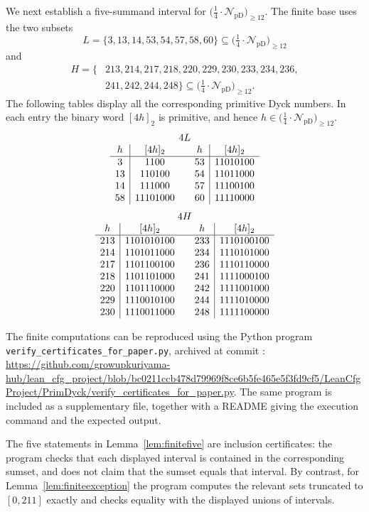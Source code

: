 \documentclass[12pt]{article}
\theoremstyle{plain}
\newcommand{\Pset}{\bigl(\tfrac14\cdot
  \mathcal N_{\mathrm{pD}}\bigr)_{\ge 12}}
\begin{document}
We next establish a five-summand interval for $\Pset$.  The finite base
uses the two subsets
\[
 L=\{3,13,14,53,54,57,58,60\}\subseteq\Pset
\]
and
\[
\begin{split}
 H=\{&213,214,217,218,220,229,230,233,234,236,\\
     &241,242,244,248\}\subseteq\Pset.
\end{split}
\]
The following tables display all the corresponding primitive Dyck
numbers.  In each entry the binary word $[4h]_2$ is primitive, and hence
$h\in\Pset$.
\[
\begin{array}{c|c@{\qquad}c|c}
\multicolumn{4}{c}{4L}\\
h&[4h]_2&h&[4h]_2\\ \hline
3&1100&53&11010100\\
13&110100&54&11011000\\
14&111000&57&11100100\\
58&11101000&60&11110000
\end{array}
\]
\[
\begin{array}{c|c@{\qquad}c|c}
\multicolumn{4}{c}{4H}\\
h&[4h]_2&h&[4h]_2\\ \hline
213&1101010100&233&1110100100\\
214&1101011000&234&1110101000\\
217&1101100100&236&1110110000\\
218&1101101000&241&1111000100\\
220&1101110000&242&1111001000\\
229&1110010100&244&1111010000\\
230&1110011000&248&1111100000
\end{array}
\]

The finite computations can be reproduced using the Python program
\texttt{verify\_certificates\_for\_paper.py}, archived at commit
:
\url{https://github.com/growupkuriyama-hub/lean_cfg_project/blob/bc0211ccb478d79969f8ce6b5fe465e5f3fd9cf5/LeanCfgProject/PrimDyck/verify_certificates_for_paper.py}.
The same program is included as a supplementary file, together with a
README giving the execution command and the expected output.

The five statements in Lemma~\ref{lem:finitefive} are inclusion
certificates: the program checks that each displayed interval is
contained in the corresponding sumset, and does not claim that the
sumset equals that interval.  By contrast, for
Lemma~\ref{lem:finiteexception} the program computes the relevant sets
truncated to $[0,211]$ exactly and checks equality with the displayed
unions of intervals.
\end{document}
